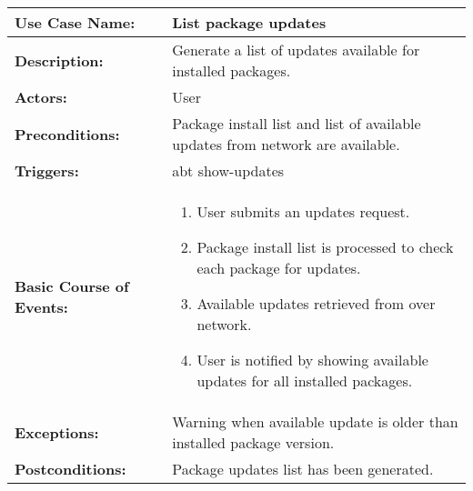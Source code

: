 
\begin{tabularx}{\linewidth}{|l|X|}
\hline
\textbf{Use Case Name:} & \textbf{List package updates} \\
\hline
\textbf{Description:} & 
Generate a list of updates available for installed packages. \\
\hline
\textbf{Actors:} & User \\
\hline
\textbf{Preconditions:} & 
Package install list and list of available updates from network are available. \\
\hline
\textbf{Triggers:} & abt show-updates \\
\hline
\textbf{Basic Course of Events:} & 
\begin{minipage}{\linewidth} 
  \vspace{0.05em}
  \begin{enumerate}
    \item User submits an updates request.
    \item Package install list is processed to check each package for updates.
    \item Available updates retrieved from over network.
    \item User is notified by showing available updates for all installed packages.
  \end{enumerate}
  \vspace{0.05em}
\end{minipage}
\\
\hline
\textbf{Exceptions:} & 
Warning when available update is older than installed package version.
\\
\hline 
\textbf{Postconditions:} &
Package updates list has been generated.
\\
\hline
\end{tabularx}


